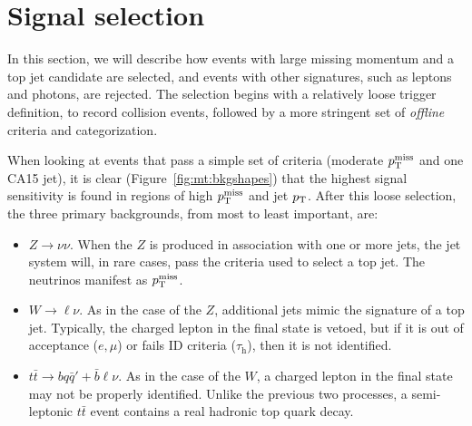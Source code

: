 \clearpage

\section{Signal selection}
\label{sec:mt:sel}

In this section, we will describe how events with large missing momentum and a top jet candidate are selected, and events with other signatures, such as leptons and photons, are rejected.
The selection begins with a relatively loose trigger definition, to record collision events, followed by a more stringent set of \emph{offline} criteria and categorization.

When looking at events that pass a simple set of criteria (moderate $p_\mathrm{T}^\mathrm{miss}$ and one CA15 jet), it is clear (Figure~\ref{fig:mt:bkgshapes}) that the highest signal sensitivity is found in regions of high $p_\mathrm{T}^\mathrm{miss}$ and jet $p_\mathrm{T}$.
After this loose selection, the three primary backgrounds, from most to least important, are:
\begin{itemize}
    \item $Z\rightarrow\nu\nu$. 
          When the $Z$ is produced in association with one or more jets, the jet system will, in rare cases, pass the criteria used to select a top jet. 
          The neutrinos manifest as $p_\mathrm{T}^\mathrm{miss}$.
    \item $W\rightarrow\ell\nu$. 
          As in the case of the $Z$, additional jets mimic the signature of a top jet. 
          Typically, the charged lepton in the final state is vetoed, but if it is out of acceptance ($e,\mu$) or fails ID criteria ($\tau_\mathrm{h}$), then it is not identified.
    \item $t\bar{t} \rightarrow bq\bar{q}' + \bar{b}\ell\nu$. 
          As in the case of the $W$, a charged lepton in the final state may not be properly identified. 
          Unlike the previous two processes, a semi-leptonic $t\bar{t}$ event contains a real hadronic top quark decay.
\end{itemize}

